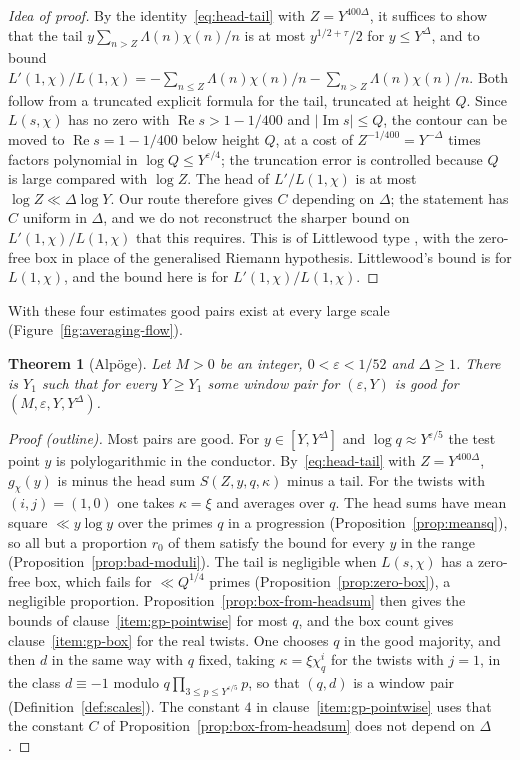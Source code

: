 \documentclass[11pt]{amsbook}
\theoremstyle{plain}
\newtheorem{theorem}{Theorem}[section]
\theoremstyle{definition}
\theoremstyle{remark}
\numberwithin{equation}{section}
\numberwithin{figure}{chapter}
\numberwithin{table}{chapter}
\newcommand{\eps}{\varepsilon}
\begin{document}
\begin{proof}[Idea of proof]
By the identity~\eqref{eq:head-tail} with $Z=Y^{400\Delta}$, it
suffices to show that the tail $y\sum_{n>Z}\Lambda(n)\chi(n)/n$ is at
most $y^{1/2+\tau}/2$ for $y\le Y^\Delta$, and to bound
$L'(1,\chi)/L(1,\chi)=-\sum_{n\le Z}\Lambda(n)\chi(n)/n
-\sum_{n>Z}\Lambda(n)\chi(n)/n$. Both follow from a truncated
explicit formula for the tail, truncated at height $Q$. Since
$L(s,\chi)$ has no zero with $\operatorname{Re}s>1-1/400$ and
$|\operatorname{Im}s|\le Q$, the contour can be moved to
$\operatorname{Re}s=1-1/400$ below height $Q$, at a cost of
$Z^{-1/400}=Y^{-\Delta}$ times factors polynomial in $\log Q\le
Y^{\eps/4}$; the truncation error is controlled because $Q$ is large
compared with $\log Z$. The head of $L'/L(1,\chi)$ is at most $\log Z\ll
\Delta\log Y$. Our route therefore gives $C$ depending on $\Delta$;
the statement has $C$ uniform in $\Delta$, and we do not reconstruct
the sharper bound on $L'(1,\chi)/L(1,\chi)$ that this requires. This
is of
Littlewood type
\cite{Littlewood1928}, with the zero-free box in place of the
generalised Riemann hypothesis. Littlewood's bound is for
$L(1,\chi)$, and the bound here is for $L'(1,\chi)/L(1,\chi)$.
\end{proof}

With these four estimates good pairs exist at every large scale (Figure~\ref{fig:averaging-flow}).

\begin{theorem}[Alp\"oge]\label{thm:good-pairs}
Let $M>0$ be an integer, $0<\eps<1/52$ and $\Delta\ge1$. There is
$Y_1$ such that for every $Y\ge Y_1$ some window pair for $(\eps,Y)$
is good for $(M,\eps,Y,Y^\Delta)$.
\end{theorem}

\begin{proof}[Proof (outline)]
Most pairs are good. For $y\in[Y,Y^\Delta]$ and
$\log q\approx Y^{\eps/5}$ the test point $y$ is polylogarithmic in
the conductor. By~\eqref{eq:head-tail} with $Z=Y^{400\Delta}$,
$g_\chi(y)$ is minus the head sum $S(Z,y,q,\kappa)$ minus a tail. For the
twists with $(i,j)=(1,0)$ one takes $\kappa=\xi$ and averages over
$q$. The head sums have mean square $\ll y\log y$ over the primes $q$
in a progression (Proposition~\ref{prop:meansq}), so all but a
proportion $r_0$ of them satisfy the bound for every $y$ in the range
(Proposition~\ref{prop:bad-moduli}). The tail is negligible when
$L(s,\chi)$ has a zero-free box, which fails for $\ll Q^{1/4}$
primes (Proposition~\ref{prop:zero-box}), a negligible proportion.
Proposition~\ref{prop:box-from-headsum} then gives the bounds of
clause~\ref{item:gp-pointwise} for most $q$, and the box count gives
clause~\ref{item:gp-box} for the
real twists. One chooses $q$ in the good majority, and then $d$ in the
same way with $q$ fixed, taking $\kappa=\xi\chi_q^i$ for the twists
with $j=1$, in the class $d\equiv-1$ modulo
$q\prod_{3\le p\le Y^{\eps/5}}p$, so that $(q,d)$ is a window pair
(Definition~\ref{def:scales}). The constant $4$ in
clause~\ref{item:gp-pointwise} uses that the constant $C$ of
Proposition~\ref{prop:box-from-headsum} does not depend on $\Delta$.
\end{proof}
\end{document}
